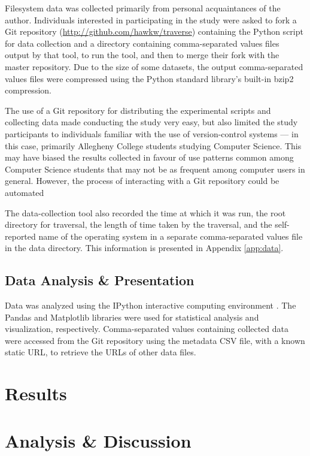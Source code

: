 \documentclass[12pt,a4paper]{article}
\begin{document}
			Filesystem data was collected primarily from personal acquaintances of the author. Individuals interested in participating in the study were asked to fork a Git repository (\url{http://github.com/hawkw/traverse}) containing the Python script for data collection and a directory containing comma-separated values files output by that tool, to run the tool, and then to merge their fork with the master repository. Due to the size of some datasets, the output comma-separated values files were compressed using the Python standard library's built-in bzip2 compression.

			The use of a Git repository for distributing the experimental scripts and collecting data made conducting the study very easy, but also limited the study participants to individuals familiar with the use of version-control systems --- in this case, primarily Allegheny College students studying Computer Science. This may have biased the results collected in favour of use patterns common among Computer Science students that may not be as frequent among computer users in general. However, the process of interacting with a Git repository could be automated 

			The data-collection tool also recorded the time at which it was run, the root directory for traversal, the length of time taken by the traversal,  and the self-reported name of the operating system in a separate comma-separated values file in the data directory. This information is presented in Appendix \ref{app:data}.

		\subsection{Data Analysis \& Presentation}

			Data was analyzed using the IPython interactive computing environment \cite{ipython}. The Pandas and Matplotlib libraries \cite{pandas,matplotlib} were used for statistical analysis and visualization, respectively. Comma-separated values containing collected data were accessed from the Git repository using the metadata CSV file, with a known static URL, to retrieve the URLs of other data files.

	\section{Results}

	\section{Analysis \& Discussion}
\end{document}
